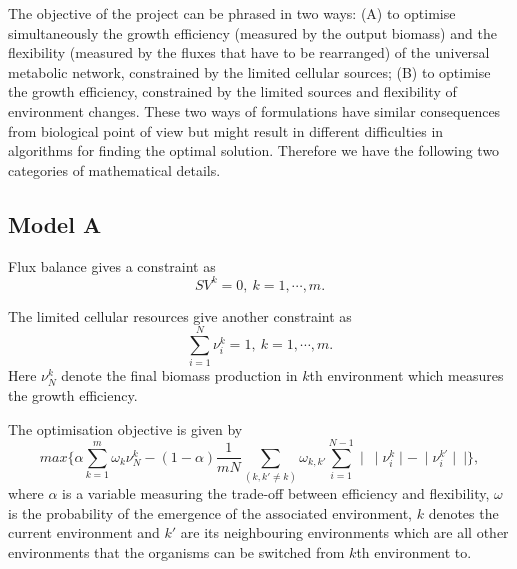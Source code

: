 \documentclass[paper=a4, fontsize=12pt]{scrartcl}	%
\numberwithin{equation}{section}					%
\numberwithin{figure}{section}					%
\numberwithin{table}{section}					%
\begin{document}
The objective of the project can be phrased in two ways: (A) to optimise simultaneously the growth efficiency (measured by the output biomass) and the flexibility (measured by the fluxes that have to be rearranged) of the universal metabolic network, constrained by the limited cellular sources; (B) to optimise the growth efficiency, constrained by the limited sources and flexibility of environment changes. These two ways of formulations have similar consequences from biological point of view but might result in different difficulties in algorithms for finding the optimal solution. Therefore we have the following two categories of mathematical details.

\subsection*{Model A}
Flux balance gives a constraint as 
\begin{equation}
\label{FBA}
SV^k=0,\ k=1,\cdots,m.
\end{equation}

The limited cellular resources give another constraint as
\begin{equation}
\label{source} \sum_{i=1}^N\nu_i^k =1,\ k=1,\cdots,m.
\end{equation}
Here $\nu_N^k$ denote the final biomass production in $k$th environment which measures the growth efficiency. 

The optimisation objective is given by
\begin{equation}\label{objective}
max\{ \alpha \sum_{k=1}^m \omega_k \nu_{N}^k-(1-\alpha) \frac{1}{mN}\sum_{(k,k'\neq k)}\omega_{k,k'} \sum_{i=1}^{N-1}\mid\ \mid\nu_i^k\mid-\ \mid\nu_i^{k'} \mid\ \mid \}, 
\end{equation}
where $\alpha$ is a variable measuring the trade-off between efficiency and flexibility, $\omega$ is the probability of the emergence of the associated environment, $k$ denotes the current environment and $k'$ are its neighbouring environments which are all other environments that the organisms can be switched from $k$th environment to. 
\end{document}
